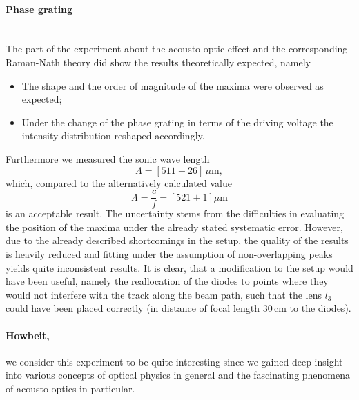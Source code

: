 \paragraph{Phase grating}~\\
The part of the experiment about the acousto-optic effect and the corresponding 
Raman-Nath theory did show the results theoretically expected, namely
\begin{itemize}
    \item The shape and the order of magnitude of the maxima were observed as expected;
    \item Under the change of the phase grating in terms of the driving voltage the
        intensity distribution reshaped accordingly. 
\end{itemize}
Furthermore we measured the sonic wave length
\begin{equation}
    \Lambda = \left [511 \pm 26 \right ]\, \mu\mathrm{m},
\end{equation}
which, compared to the alternatively calculated value
\begin{equation}
\Lambda = \frac{c}{f} = \left [521 \pm 1 \right ] \mu\mathrm{m}
\end{equation}
is an acceptable result. The uncertainty stems from the difficulties
in evaluating the position of the maxima under the already stated systematic error.
However, 
due to the already described shortcomings in the setup, the quality of the 
results is heavily reduced and fitting under the assumption of non-overlapping 
peaks yields quite inconsistent results. 
It is clear, that a modification to the setup would have been useful, 
namely the reallocation of the diodes to points where they would not interfere 
with the track along the beam path, such that the lens $l_3$ could have been placed 
correctly (in distance of focal length $30\,$cm to the diodes). \\

\paragraph{Howbeit,} we consider this experiment to be quite interesting since we gained deep 
insight into various concepts of optical physics in general and the
fascinating phenomena of acousto optics in particular.
